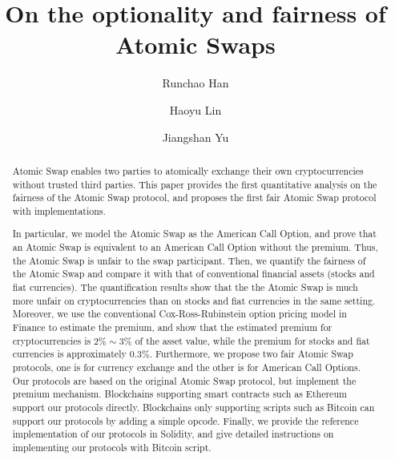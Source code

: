 \documentclass[sigconf, natbib=false]{acmart}
\renewcommand\_{\textunderscore\allowbreak}
\begin{document}
\title{On the optionality and fairness of Atomic Swaps}

\author{Runchao Han}

\author{Haoyu Lin}
\affiliation{%
  \institution{}
}

\author{Jiangshan Yu}

\begin{abstract}
Atomic Swap enables two parties to atomically exchange their own cryptocurrencies without trusted third parties.
This paper provides the first quantitative analysis on the fairness of
the Atomic Swap protocol, and proposes the first fair Atomic Swap
protocol with implementations.

In particular, we model the Atomic Swap as the American Call Option,
and prove that an Atomic Swap is equivalent to an American Call Option
without the premium. Thus, the Atomic Swap is unfair to the swap
participant.  Then, we quantify the fairness of the Atomic Swap and
compare it with that of conventional financial assets (stocks and fiat
currencies).  The quantification results show that the the Atomic Swap
is much more unfair on cryptocurrencies than on stocks and fiat
currencies in the same setting.
Moreover, we use the conventional Cox-Ross-Rubinstein option pricing model in Finance to estimate the premium, and show that the estimated premium for cryptocurrencies is $2\% \sim 3\%$ of the asset value, while the premium for stocks and fiat currencies is approximately $0.3\%$.
Furthermore, we propose two fair Atomic Swap protocols, one is for
currency exchange and the other is for American Call Options. Our
protocols are based on the original Atomic Swap protocol, but
implement the premium mechanism.  Blockchains supporting smart
contracts such as Ethereum support our protocols directly.
Blockchains only supporting scripts such as Bitcoin can support our
protocols by adding a simple opcode.  Finally, we provide the
reference implementation of our protocols in Solidity, and give
detailed instructions on implementing our protocols with Bitcoin
script.
\end{abstract}


  
\end{document}

